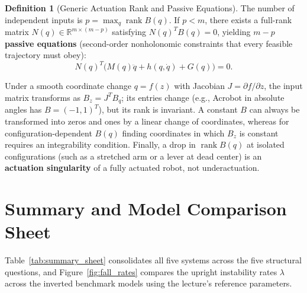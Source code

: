 \documentclass[11pt, a4paper]{article}
\theoremstyle{definition}
\newtheorem{definition}{Definition}[section]
\theoremstyle{plain}
\begin{document}
\begin{definition}[Generic Actuation Rank and Passive Equations]
The number of independent inputs is $p = \max_q \operatorname{rank} B(q)$. If $p < m$, there exists a full-rank matrix $N(q) \in \mathbb{R}^{m \times (m-p)}$ satisfying $N(q)^T B(q) = 0$, yielding $m - p$ \textbf{passive equations} (second-order nonholonomic constraints that every feasible trajectory must obey):
\[
  N(q)^T \big(M(q)\ddot{q} + h(q,\dot{q}) + G(q)\big) = 0.
\]
\end{definition}

Under a smooth coordinate change $q = f(z)$ with Jacobian $J = \partial f/\partial z$, the input matrix transforms as $B_z = J^T B_q$; its entries change (e.g., Acrobot in absolute angles has $B = (-1,1)^T$), but its rank is invariant. A constant $B$ can always be transformed into zeros and ones by a linear change of coordinates, whereas for configuration-dependent $B(q)$ finding coordinates in which $B_z$ is constant requires an integrability condition. Finally, a drop in $\operatorname{rank} B(q)$ at isolated configurations (such as a stretched arm or a lever at dead center) is an \textbf{actuation singularity} of a fully actuated robot, not underactuation.

\section{Summary and Model Comparison Sheet}

Table~\ref{tab:summary_sheet} consolidates all five systems across the five structural questions, and Figure~\ref{fig:fall_rates} compares the upright instability rates $\lambda$ across the inverted benchmark models using the lecture's reference parameters.
\end{document}
